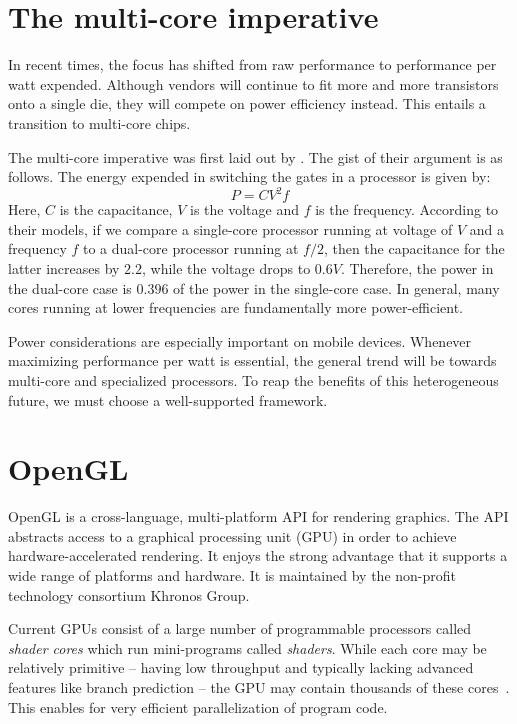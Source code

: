 \documentclass[english,12pt]{ifimaster}
\begin{document}
\section{The multi-core imperative}

In recent times, the focus has shifted from raw performance to
performance per watt expended. Although vendors will continue to fit
more and more transistors onto a single die, they will compete on
power efficiency instead. This entails a transition to multi-core
chips.

The multi-core imperative was first laid out by
\citet{chandrakasan95:-power}. The gist of their argument is as
follows. The energy expended in switching the gates in a processor is
given by:
\begin{equation}
P = CV^2f
\end{equation}
Here, $C$ is the capacitance, $V$ is the voltage and $f$ is the
frequency. According to their models, if we compare a single-core
processor running at voltage of $V$ and a frequency $f$ to a dual-core
processor running at $f/2$, then the capacitance for the latter
increases by $2.2$, while the voltage drops to $0.6V$. Therefore, the
power in the dual-core case is $0.396$ of the power in the single-core
case. In general, many cores running at lower frequencies are
fundamentally more power-efficient.

Power considerations are especially important on mobile devices.
Whenever maximizing performance per watt is essential, the general
trend will be towards multi-core and specialized processors. To reap
the benefits of this heterogeneous future, we must choose a
well-supported framework.

\section{OpenGL}

OpenGL is a cross-language, multi-platform API for rendering graphics.
The API abstracts access to a graphical processing unit (GPU) in order
to achieve hardware-accelerated rendering. It enjoys the strong
advantage that it supports a wide range of platforms and hardware. It
is maintained by the non-profit technology consortium Khronos Group.

Current GPUs consist of a large number of programmable processors
called \emph{shader cores} which run mini-programs called
\emph{shaders}. While each core may be relatively primitive -- having
low throughput and typically lacking advanced features like branch
prediction -- the GPU may contain thousands of these
cores~\citep{sellers14:-opengl-super}. This enables for very efficient
parallelization of program code.
\end{document}
